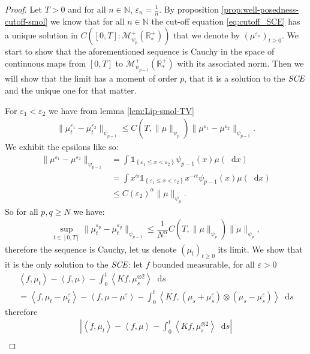 \documentclass[11pt,a4paper]{article}
\newcommand{\NN}{\mathbb{N}}
\newcommand{\RRP}{\mathbb{R}^+_*}
\newcommand{\MC}{\mathcal{M}}
\newcommand{\SCE}{\emph{SCE}}
\newcommand{\Proc}[1]{\left(#1\right)_{t\geq 0}}
\newcommand{\indic}[1]{\mathds{1}_{\left\lbrace#1\right\rbrace}}
\newcommand{\brac}[1]{\left\langle#1\right\rangle}
\newcommand{\dd}{\mathop{}\!\mathrm{d}}
\begin{document}
\begin{proof}
    Let $T > 0$ and for all $n\in \NN$, $\varepsilon_n = \frac1n$. By proposition \ref{prop:well-posedness-cutoff-smol} we know that for all $n \in \NN$ the cut-off equation \eqref{eq:cutoff_SCE} has a unique solution in $C\left([0,T]: \MC_{\psi_{p}}^+ (\RRP)\right)$ that we denote by $\Proc{\mu^{\varepsilon_n}}$. We start to show that the aforementioned sequence is Cauchy in the space of continuous maps from $[0,T]$ to $\MC_{\psi_{p-1}}^+ (\RRP)$ with its associated norm. Then we will show that the limit has a moment of order $p$, that it is a solution to the $\SCE$ and the unique one for that matter.
    
    For $\varepsilon_1 < \varepsilon_2$ we have from lemma \ref{lem:Lip-smol-TV} 
    \begin{align*}
        \| \mu_t^{\varepsilon_1}- \mu_t^{\varepsilon_2}\|_{\psi_{p-1}} \leq C(T,\|\mu\|_{\psi_{p}}) \| \mu^{\varepsilon_1}- \mu^{\varepsilon_2}\|_{\psi_{p-1}}.
    \end{align*}
    We exhibit the epsilons like so:
    \begin{align*}
        \| \mu^{\varepsilon_1}- \mu^{\varepsilon_2}\|_{\psi_{p-1}} &= \int\indic{\varepsilon_1 \leq x < \varepsilon_2} \psi_{p-1}(x)\mu(\dd x)\\
        &= \int x^{\alpha} \indic{\varepsilon_1 \leq x < \varepsilon_2} x^{-\alpha}\psi_{p-1}(x)\mu(\dd x)\\
        &\leq C(\varepsilon_2)^\alpha \|\mu\|_{\psi_{p}}.
    \end{align*}
    So for all $p,q \geq N$ we have:
    \begin{align*}
        \sup\limits_{t \in [0,T]} \| \mu_t^{\varepsilon_p}- \mu_t^{\varepsilon_q}\|_{\psi_{p-1}} \leq \dfrac{1}{N^\alpha} C(T,\|\mu\|_{\psi_{p}}) \| \mu\|_{\psi_p},
    \end{align*}
    therefore the sequence is Cauchy, let us denote $\Proc{\mu_t}$ its limit. We show that it is the only solution to the $\SCE$: let $f$ bounded measurable, for all $\varepsilon > 0$
    \begin{multline*}
        \brac{f,\mu_t} - \brac{f,\mu} - \int_0^t\brac{Kf,\mu_s^{\otimes 2}}\dd s \\
        = \brac{f,\mu_t-\mu_t^\varepsilon} - \brac{f,\mu-\mu^\varepsilon} - \int_0^t\brac{Kf,(\mu_s+ \mu^\varepsilon_s)\otimes (\mu_s - \mu^\varepsilon_s)}\dd s
    \end{multline*}
    therefore
    \begin{multline*}
        \left|\brac{f,\mu_t} - \brac{f,\mu} - \int_0^t\brac{Kf,\mu_s^{\otimes 2}}\dd s\right|\\

\end{multline*}
\end{proof}
\end{document}
